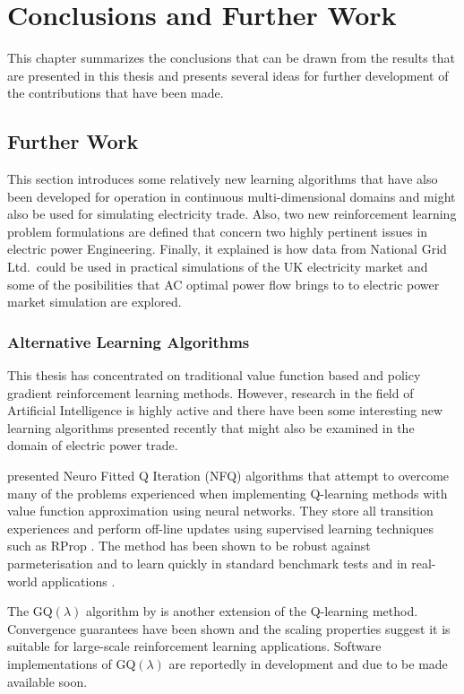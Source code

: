 \chapter{Conclusions and Further Work}
This chapter summarizes the conclusions that can be drawn from the
results that are presented in this thesis and presents several ideas for
further development of the contributions that have been made.

\section{Further Work}
\label{sec:furtherwork}
This section introduces some relatively new learning algorithms that have
also been developed for operation in continuous multi-dimensional domains and
might also be used for simulating electricity trade.  Also, two new
reinforcement learning problem formulations are defined that concern two
highly pertinent issues in electric power Engineering.  Finally, it explained
is how data from National Grid Ltd.~could be used in practical simulations of the UK
electricity market and some of the posibilities that AC optimal power
flow brings to to electric power market simulation are explored.

\subsection{Alternative Learning Algorithms}
This thesis has concentrated on traditional value function based and policy
gradient reinforcement learning methods.  However, research in the field of
Artificial Intelligence is highly active and there have been some interesting
new learning algorithms presented recently that might also be examined in the
domain of electric power trade.

 presented Neuro Fitted Q Iteration (NFQ) algorithms
that attempt to overcome many of the problems experienced when implementing
Q-learning methods with value function approximation using neural networks.
They store all transition experiences and perform off-line updates using
supervised learning techniques such as RProp \cite{riedmiller93}.  The method
has been shown to be robust against parmeterisation and to learn quickly in
standard benchmark tests and in real-world applications \cite{kietzmann09}.

The GQ$(\lambda)$ algorithm by  is another extension of the
Q-learning method.  Convergence guarantees have been shown and the scaling
properties suggest it is suitable for large-scale reinforcement learning
applications.  Software implementations of GQ$(\lambda)$ are reportedly in
development and due to be made available soon.

